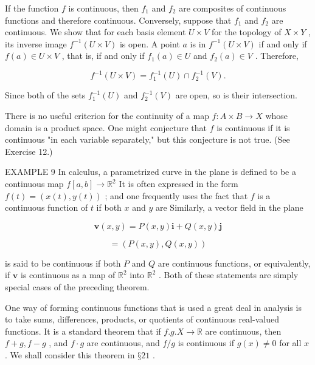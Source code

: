 If the function \(f\) is continuous, then \({f}_{1}\) and \({f}_{2}\) are composites of continuous functions and therefore continuous. Conversely, suppose that \({f}_{1}\) and \({f}_{2}\) are continuous. We show that for each basis element \(U \times  V\) for the topology of \(X \times  Y\) , its inverse image \({f}^{-1}\left( {U \times  V}\right)\) is open. A point \(a\) is in \({f}^{-1}\left( {U \times  V}\right)\) if and only if \(f\left( a\right)  \in  U \times  V\) , that is, if and only if \({f}_{1}\left( a\right)  \in  U\) and \({f}_{2}\left( a\right)  \in  V\) . Therefore,

\[
{f}^{-1}\left( {U \times  V}\right)  = {f}_{1}^{-1}\left( U\right)  \cap  {f}_{2}^{-1}\left( V\right) .
\]

Since both of the sets \({f}_{1}^{-1}\left( U\right)\) and \({f}_{2}^{-1}\left( V\right)\) are open, so is their intersection.

There is no useful criterion for the continuity of a map \(f : A \times  B \rightarrow  X\) whose domain is a product space. One might conjecture that \(f\) is continuous if it is continuous "in each variable separately," but this conjecture is not true. (See Exercise 12.)

EXAMPLE 9 In calculus, a parametrized curve in the plane is defined to be a continuous map \(f\left\lbrack  {a,b}\right\rbrack   \rightarrow  {\mathbb{R}}^{2}\) It is often expressed in the form \(f\left( t\right)  = \left( {x\left( t\right) ,y\left( t\right) }\right)\) ; and one frequently uses the fact that \(f\) is a continuous function of \(t\) if both \(x\) and \(y\) are Similarly, a vector field in the plane

\[
\mathbf{v}\left( {x,y}\right)  = P\left( {x,y}\right) \mathbf{i} + Q\left( {x,y}\right) \mathbf{j}
\]

\[
= \left( {P\left( {x,y}\right) ,Q\left( {x,y}\right) }\right)
\]

is said to be continuous if both \(P\) and \(Q\) are continuous functions, or equivalently, if \(\mathbf{v}\) is continuous as a map of \({\mathbb{R}}^{2}\) into \({\mathbb{R}}^{2}\) . Both of these statements are simply special cases of the preceding theorem.

One way of forming continuous functions that is used a great deal in analysis is to take sums, differences, products, or quotients of continuous real-valued functions. It is a standard theorem that if \(f.g.X \rightarrow  \mathbb{R}\) are continuous, then \(f + g,f - g\) , and \(f \cdot  g\) are continuous, and \(f/g\) is continuous if \(g\left( x\right)  \neq  0\) for all \(x\) . We shall consider this theorem in \(§{21}\) .

